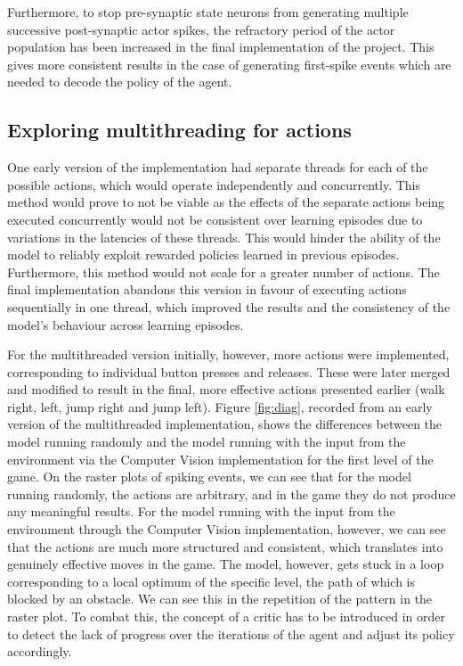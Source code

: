 \documentclass[10pt]{article}
\begin{document}
    Furthermore, to stop pre-synaptic state neurons from generating multiple successive post-synaptic actor spikes, the refractory period of the actor population has been increased in the final implementation of the project. This gives more consistent results in the case of generating first-spike events which are needed to decode the policy of the agent.

    \subsection{Exploring multithreading for actions}

    One early version of the implementation had separate threads for each of the possible actions, which would operate independently and concurrently. This method would prove to not be viable as the effects of the separate actions being executed concurrently would not be consistent over learning episodes due to variations in the latencies of these threads. This would hinder the ability of the model to reliably exploit rewarded policies learned in previous episodes. Furthermore, this method would not scale for a greater number of actions. The final implementation abandons this version in favour of executing actions sequentially in one thread, which improved the results and the consistency of the model's behaviour across learning episodes.
    
    For the multithreaded version initially, however, more actions were implemented, corresponding to individual button presses and releases. These were later merged and modified to result in the final, more effective actions presented earlier (walk right, left, jump right and jump left). Figure \ref{fig:diag}, recorded from an early version of the multithreaded implementation, shows the differences between the model running randomly and the model running with the input from the environment via the Computer Vision implementation for the first level of the game. On the raster plots of spiking events, we can see that for the model running randomly, the actions are arbitrary, and in the game they do not produce any meaningful results. For the model running with the input from the environment through the Computer Vision implementation, however, we can see that the actions are much more structured and consistent, which translates into genuinely effective moves in the game. The model, however, gets stuck in a loop corresponding to a local optimum of the specific level, the path of which is blocked by an obstacle. We can see this in the repetition of the pattern in the raster plot. To combat this, the concept of a critic has to be introduced in order to detect the lack of progress over the iterations of the agent and adjust its policy accordingly.
\end{document}
